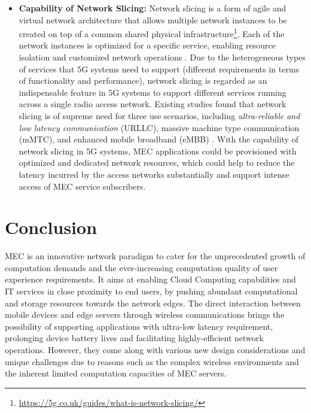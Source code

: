 \documentclass[journal]{IEEEtran}
\begin{document}
{{\begin{itemize}
\item{\textbf{Capability of Network Slicing:}} Network slicing is a form of agile and virtual network architecture that allows multiple network instances to be created on top of a common shared physical infrastructure\footnote{\color{black}\url{https://5g.co.uk/guides/what-is-network-slicing/}}. Each of the network instances is optimized for a specific service, enabling resource isolation and customized network operations \cite{NGMNslicing}. Due to the heterogeneous types of services that 5G systems need to support (different requirements in terms of functionality and performance), network slicing is regarded as an indispensable feature in 5G systems to support different services running across a single radio access network. Existing studies found that network slicing is of supreme need for three use scenarios, including \emph{ultra-reliable and low latency communication} (URLLC), massive machine type communication (mMTC), and enhanced mobile broadband (eMBB) \cite{NetworkSlicingSlides}. With the capability of network slicing in 5G systems, MEC applications could be provisioned with optimized and dedicated network resources, which could help to reduce the latency incurred by the access networks substantially and support intense access of MEC service subscribers.
\end{itemize}
}


\section{Conclusion}\label{Section:Conclusion}

MEC is an innovative network paradigm to cater for the unprecedented growth of computation demands and the ever-increasing computation quality of user experience requirements. It aims at enabling Cloud Computing capabilities and IT services in close proximity to end users, by pushing abundant computational and storage resources towards the network edges. The direct interaction between mobile devices and edge servers through wireless communications brings the possibility of supporting applications with ultra-low latency requirement, prolonging device battery lives and facilitating highly-efficient network operations. However, they come along with various new design considerations and unique challenges due to reasons such as the complex wireless environments and the inherent limited computation capacities of MEC servers.

}
\end{document}
